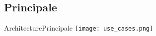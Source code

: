 \subsection{Principale}

\begin{frame}{Architecture}{Principale}
    \texttt{[image: use\_cases.png]}
\end{frame}